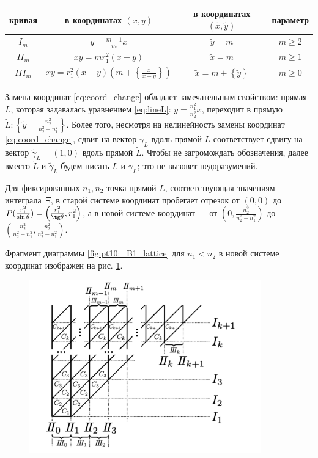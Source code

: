 \begin{center}
\begin{tabular}{|c|c|c|c|}
\hline 
кривая & в координатах $(x,y)$  	& 	в координатах $(\widetilde{x},\widetilde{y})$				& 	параметр\\ \hline 
\hline 
$I_m$ 		& 	$y = \frac{m-1}{m} x$ 	& $\widetilde{y} = m$  		&	$m \geq 2$ \\ \hline 
$II_m$ 		&	$x y = m r_1^2 (x-y)$  	& $\widetilde{x}= m$ 		&	$m \geq 1$ \\ \hline 
$III_m$ 		&	$x y = r_1^2 (x-y) \left( m + \left\{\frac{x}{x-y}\right\}\right)$  & $\widetilde{x} = m + \left\{ \widetilde{y} \right\}$  	&	$m \geq 0$ \\ \hline 
\end{tabular}
\end{center}
Замена координат \eqref{eq:coord_change} обладает замечательным свойством: прямая $L$, которая задавалась уравнением \eqref{eq:lineL}: $y=\frac{n_1^2}{n_2^2} x$, переходит в прямую $\widetilde{L}: \left\{\widetilde{y} = \frac{n_2^2}{n_2^2-n_1^2} \right\}$.
Более того, несмотря на нелинейность замены координат \eqref{eq:coord_change}, сдвиг на вектор ${\gamma}_L$ вдоль прямой $L$ соответствует сдвигу на вектор $\widetilde{\gamma}_L = (1,0)$ вдоль прямой $\widetilde{L}$.
Чтобы не загромождать обозначения, далее вместо  $\widetilde{L}$ и $\widetilde{\gamma}_L$  будем  писать $L$ и $\gamma_L$; это не вызовет недоразумений.

Для фиксированных $n_1,n_2$ точка прямой $L$, соответствующая значениям интеграла $\Xi$, в старой системе координат пробегает отрезок от $(0, 0)$ до $P(\frac{r_1^2}{\sin \theta}) = \left(\frac{r_1^2}{\tg \theta}, r_1^2\right)$, а в новой системе координат --- от $\left(0,\frac{n_2^2}{n_2^2-n_1^2}\right)$ до $\left(\frac{n_2^2}{n_2^2-n_1^2}, \frac{n_2^2}{n_2^2-n_1^2}\right)$.

Фрагмент диаграммы  \ref{fig:pt10:_B1_lattice} для $n_1 < n_2$ в новой системе координат изображен на рис. \ref{fig:pt10:_B1_lattice_straight}.
\begin{figure}[!htb]
\centering
\includegraphics[width=10cm]{images/section3_circular/B1_lattice_straight.pdf}
    \caption{}
    \label{fig:pt10:_B1_lattice_straight}
\end{figure}

